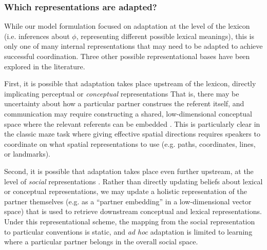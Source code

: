 
%

\subsubsection{Which representations are adapted?}
While our model formulation focused on adaptation at the level of the lexicon (i.e. inferences about $\phi$, representing different possible lexical meanings), this is only one of many internal representations that may need to be adapted to achieve successful coordination. 
Three other possible representational bases have been explored in the literature. 

First, it is possible that adaptation takes place upstream of the lexicon, directly implicating perceptual or \emph{conceptual} representations \cite{GarrodAnderson87_SayingWhatYouMean,HealeySwobodaUmataKing07_GraphicalLanguageGames}
That is, there may be uncertainty about how a particular partner construes the referent itself, and communication may require constructing a shared, low-dimensional conceptual space where the relevant referents can be embedded \cite{stolk2016conceptual}.
This is particularly clear in the classic maze task \cite{GarrodAnderson87_SayingWhatYouMean} where giving effective spatial directions requires speakers to coordinate on what spatial representations to use (e.g. paths, coordinates, lines, or landmarks). 

Second, it is possible that adaptation takes place even further upstream, at the level of \emph{social} representations \cite{jaech2018low}.
Rather than directly updating beliefs about lexical or conceptual representations, we may update a holistic representation of the partner themselves (e.g. as a ``partner embedding'' in a low-dimensional vector space) that is used to retrieve downstream conceptual and lexical representations. 
Under this representational scheme, the mapping from the social representation to particular conventions is static, and \emph{ad hoc} adaptation is limited to learning where a particular partner belongs in the overall social space.


